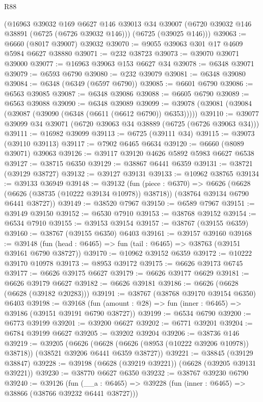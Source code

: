 \begin{lexlean}{R88}
\begin{coremodule}
    (@16963
      @39032
      @169
      @6627
      @146
      @39013
      @34
      @39007
      (@6720 @39032 @146 @38891 (@6725 (@6726 @39032 @146)))
      (@6725 (@39025 @146)))
@39063 := @6660 (@8017 @39007) @39032
@39070 := @9055 @39063 @301 @17 @4609 @5984 @6627 @38880
@39071 := @232 @38723
@39073 := @39070 @39071 @39000
@39077 := @16963 @39063 @153 @6627 @34
@39078 := @6348 @39071
@39079 := @6593 @6790
@39080 := @232 @39079
@39081 := @6348 @39080
@39084 := @6348 (@6349 (@6597 @6790))
@39085 := @6601 @6790
@39086 := @6563 @39085
@39087 := @6348 @39086
@39088 := @6605 @6790
@39089 := @6563 @39088
@39090 := @6348 @39089
@39099 := @39078 (@39081 (@39084 (@39087 (@39090 (@6348 (@6611 (@6612 @6790)) @6353)))))
@39110 := @39077 @39099 @34 @39071 (@6720 @39063 @34 @38889 (@6725 (@6726 @39063 @34)))
@39111 := @16982 @39099
@39113 := @6725 (@39111 @34)
@39115 := @39073 (@39110 @39113)
@39117 := @7902 @6465 @6634
@39120 := @6660 (@8089 @39071) @39063
@39126 := @39117 @39120 @4626 @5892 @5983 @6627 @6538
@39127 := @38715 @6350
@39129 := @38867 @6441 @6359
@39131 := @38721 (@39129 @38727)
@39132 := @39127 @39131
@39133 := @10962 @38765
@39134 := @39133 @36949
@39148 := @39132
    (fun (piece : @6370) =>
    @6626 (@6628 (@6626 (@38735 (@10222 @39134 @10978)) @38718)) (@38764 @39134 @6790 @6441 @38727))
@39149 := @38520 @7967
@39150 := @6589 @7967
@39151 := @39149 @39150
@39152 := @6530 @7910
@39153 := @38768 @39152
@39154 := @6534 @7910
@39155 := @39153 @39154
@39157 := @38767 (@39155 @6359)
@39160 := @38767 (@39155 @6350) @6403
@39161 := @39157 @39160
@39168 := @39148 (fun (head : @6465) => fun (tail : @6465) => @38763 (@39151 @39161 @6790 @38727))
@39170 := @10962 @39152 @6359
@39172 := @10222 @39170 @10978
@39173 := @8953 @39172
@39175 := @6626 @39173 @6745
@39177 := @6626 @39175 @6627
@39179 := @6626 @39177 @6629
@39181 := @6626 @39179 @6627
@39182 := @6626 @39181
@39186 := @6626 (@6628 (@6628 (@39182 @20283)))
@39191 := @38767 (@38768 @39170 @39154 @6350) @6403
@39198 := @39168 (fun (amount : @28) => fun (inner : @6465) => @39186 (@39151 @39191 @6790 @38727))
@39199 := @6534 @6790
@39200 := @6773 @39199
@39201 := @39200 @6627
@39202 := @6771 @39201
@39204 := @6784 @39199 @6627
@39205 := @39202 @39204
@39206 := @38736 @146
@39219 := @39205
    (@6626 (@6628 (@6626 (@8953 (@10222 @39206 @10978)) @38718)) (@38521 @39206 @6441 @6359 @38727))
@39221 := @38845 (@39129 @38847)
@39228 := @39198 (@6628 (@39219 @39221)) (@6628 (@39205 @39131 @39221))
@39230 := @38770 @6627 @6350
@39232 := @38767 @39230 @6790
@39240 := @39126
    (fun (__a : @6465) => @39228 (fun (inner : @6465) => @38866 (@38766 @39232 @6441 @38727)))

\end{coremodule}
\end{lexlean}
